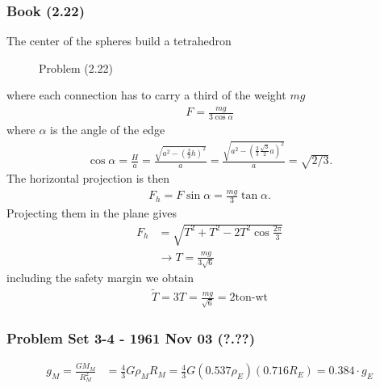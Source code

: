 \documentclass[10pt,a4paper]{book}
\theoremstyle{definition}
\begin{document}
\subsubsection{Book (2.22)}
The center of the spheres build a tetrahedron
\begin{figure}[!h]
\centering
{}
\caption{Problem (2.22)}
\end{figure}
where each connection has to carry a third of the weight $mg$
\begin{align}
F=\frac{mg}{3\cos\alpha}
\end{align}
where $\alpha$ is the angle of the edge
\begin{align}
\cos\alpha=\frac{H}{a}=\frac{\sqrt{a^2-\left(\frac{2}{3}h\right)^2}}{a}=\frac{\sqrt{a^2-\left(\frac{2}{3}\frac{\sqrt{3}}{2}a\right)^2}}{a}=\sqrt{2/3}.
\end{align}
The horizontal projection is then
\begin{align}
F_h=F\sin\alpha=\frac{mg}{3}\tan\alpha.
\end{align}
Projecting them in the plane gives
\begin{align}
F_h&=\sqrt{T^2+T^2-2T^2\cos\frac{2\pi}{3}}\\
&\rightarrow T=\frac{mg}{3\sqrt{6}}
\end{align}
including the safety margin we obtain
\begin{align}
\widetilde{T}=3T=\frac{mg}{\sqrt{6}}=2\text{ton-wt}
\end{align}


\subsubsection{Problem Set 3-4 - 1961 Nov 03 (?.??)}
\begin{align}
    g_M=\frac{GM_M}{R_M^2}&=\frac{4}{3}G\rho_M R_M=\frac{4}{3}G (0.537\rho_E) (0.716R_E)=0.384 \cdot g_E
\end{align}
\end{document}
